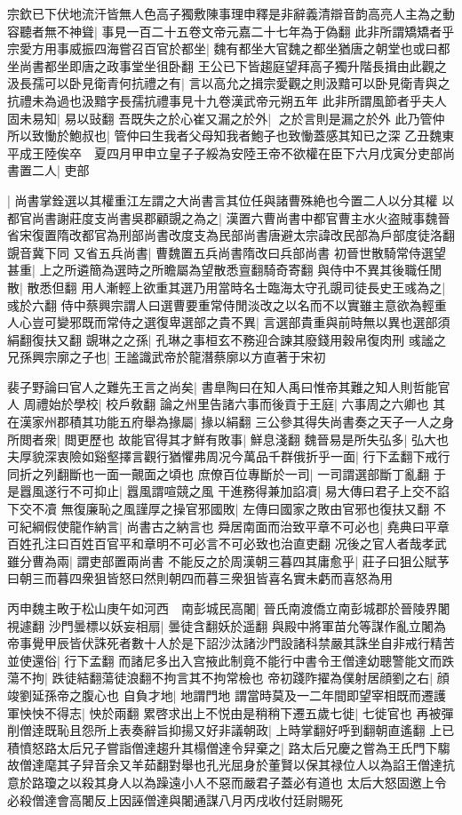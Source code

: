 宗欽已下伏地流汗皆無人色高子獨敷陳事理申釋是非辭義清辯音韵高亮人主為之動容聽者無不神聳|{
	事見一百二十五卷文帝元嘉二十七年為于偽翻}
此非所謂矯矯者乎宗愛方用事威振四海嘗召百官於都坐|{
	魏有都坐大官魏之都坐猶唐之朝堂也或曰都坐尚書都坐即唐之政事堂坐徂卧翻}
王公已下皆趨庭望拜高子獨升階長揖由此觀之汲長孺可以卧見衛青何抗禮之有|{
	言以高允之揖宗愛觀之則汲黯可以卧見衛青與之抗禮未為過也汲黯字長孺抗禮事見十九卷漢武帝元朔五年}
此非所謂風節者乎夫人固未易知|{
	易以䜴翻}
吾既失之於心崔又漏之於外|{
	之於言則是漏之於外}
此乃管仲所以致慟於鮑叔也|{
	管仲曰生我者父母知我者鮑子也致慟蓋感其知已之深}
乙丑魏東平成王陸俟卒　夏四月甲申立皇子子綏為安陸王帝不欲權在臣下六月戊寅分吏部尚書置二人|{
	吏部}


|{
	尚書掌銓選以其權重江左謂之大尚書言其位任與諸曹殊絶也今置二人以分其權}
以都官尚書謝莊度支尚書吳郡顧覬之為之|{
	漢置六曹尚書中都官曹主水火盗賊事魏晉省宋復置隋改都官為刑部尚書改度支為民部尚書唐避太宗諱改民部為戶部度徒洛翻覬音冀下同}
又省五兵尚書|{
	曹魏置五兵尚書隋改曰兵部尚書}
初晉世散騎常侍選望甚重|{
	上之所遴簡為選時之所瞻屬為望散悉亶翻騎奇寄翻}
與侍中不異其後職任閒散|{
	散悉但翻}
用人漸輕上欲重其選乃用當時名士臨海太守孔覬司徒長史王彧為之|{
	彧於六翻}
侍中蔡興宗謂人曰選曹要重常侍閒淡改之以名而不以實雖主意欲為輕重人心豈可變邪既而常侍之選復卑選部之貴不異|{
	言選部貴重與前時無以異也選部須絹翻復扶又翻}
覬琳之之孫|{
	孔琳之事桓玄不務迎合諫其廢錢用穀帛復肉刑}
彧謐之兄孫興宗廓之子也|{
	王謐識武帝於龍潛蔡廓以方直著于宋初}


裴子野論曰官人之難先王言之尚矣|{
	書臯陶曰在知人禹曰惟帝其難之知人則哲能官人}
周禮始於學校|{
	校戶敎翻}
論之州里告諸六事而後貢于王庭|{
	六事周之六卿也}
其在漢家州郡積其功能五府舉為掾屬|{
	掾以絹翻}
三公參其得失尚書奏之天子一人之身所閲者衆|{
	閲更歷也}
故能官得其才鮮有敗事|{
	鮮息淺翻}
魏晉易是所失弘多|{
	弘大也}
夫厚貌深衷險如谿壑擇言觀行猶懼弗周况今萬品千群俄折乎一面|{
	行下孟翻下戒行同折之列翻斷也一面一覿面之頃也}
庶僚百位專斷於一司|{
	一司謂選部斷丁亂翻}
于是囂風遂行不可抑止|{
	囂風謂喧競之風}
干進務得兼加諂凟|{
	易大傳曰君子上交不諂下交不凟}
無復廉恥之風謹厚之操官邪國敗|{
	左傳曰國家之敗由官邪也復扶又翻}
不可紀綱假使龍作納言|{
	尚書古之納言也}
舜居南面而治致平章不可必也|{
	堯典曰平章百姓孔注曰百姓百官平和章明不可必言不可必致也治直吏翻}
况後之官人者哉孝武雖分曹為兩|{
	謂吏部置兩尚書}
不能反之於周漢朝三暮四其庸愈乎|{
	莊子曰狙公賦芧曰朝三而暮四衆狙皆怒曰然則朝四而暮三衆狙皆喜名實未虧而喜怒為用}


丙申魏主畋于松山庚午如河西　南彭城民高闍|{
	晉氏南渡僑立南彭城郡於晉陵界闍視遽翻}
沙門曇標以妖妄相扇|{
	曇徒含翻妖於遥翻}
與殿中將軍苗允等謀作亂立闍為帝事覺甲辰皆伏誅死者數十人於是下詔沙汰諸沙門設諸科禁嚴其誅坐自非戒行精苦並使還俗|{
	行下孟翻}
而諸尼多出入宫掖此制竟不能行中書令王僧達幼聰警能文而跌蕩不拘|{
	跌徒結翻蕩徒浪翻不拘言其不拘常檢也}
帝初踐阼擢為僕射居顔劉之右|{
	顔竣劉延孫帝之腹心也}
自負才地|{
	地謂門地}
謂當時莫及一二年間即望宰相既而遷護軍怏怏不得志|{
	怏於兩翻}
累啓求出上不悦由是稍稍下遷五歲七徙|{
	七徙官也}
再被彈削僧逹既恥且怨所上表奏辭旨抑揚又好非議朝政|{
	上時掌翻好呼到翻朝直遙翻}
上已積憤怒路太后兄子嘗詣僧達趨升其榻僧達令舁棄之|{
	路太后兄慶之嘗為王氏門下騶故僧達麾其子舁音余又羊茹翻對舉也孔光屈身於董賢以保其禄位人以為諂王僧達抗意於路瓊之以殺其身人以為躁遠小人不惡而嚴君子蓋必有道也}
太后大怒固邀上令必殺僧達會高闍反上因誣僧達與闍通謀八月丙戌收付廷尉賜死

